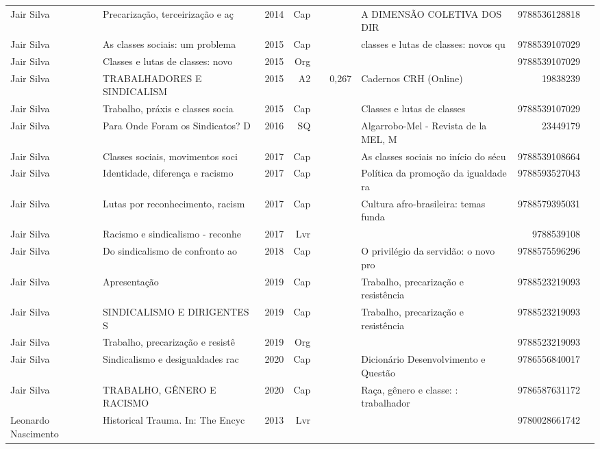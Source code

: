 \documentclass[12pt,brazil]{article}\usepackage[]{graphicx}\usepackage[]{xcolor}
\begin{document}
\begin{longtable}{lllrrllrr}
\rowcolor{coautr}Jair Silva & Precarização, terceirização e aç & 2014 & Cap &  &  & A DIMENSÃO COLETIVA DOS DIR & 9788536128818 \\
\rowcolor{ninval}Jair Silva & As classes sociais: um problema  & 2015 & Cap &  &  & classes e lutas de classes: novos qu & 9788539107029 \\
\rowcolor{ninval}Jair Silva & Classes e lutas de classes: novo & 2015 & Org &  &  &  & 9788539107029 \\
Jair Silva & TRABALHADORES E SINDICALISM & 2015 & A2 &  & 0,267 & Cadernos CRH (Online) & 19838239 \\
\rowcolor{ninval}Jair Silva & Trabalho, práxis e classes socia & 2015 & Cap &  &  & Classes e lutas de classes & 9788539107029 \\
Jair Silva & Para Onde Foram os Sindicatos? D & 2016 & SQ &  &  & Algarrobo-Mel - Revista de la MEL, M & 23449179 \\
Jair Silva & Classes sociais, movimentos soci & 2017 & Cap &  &  & As classes sociais no início do sécu & 9788539108664 \\
Jair Silva & Identidade, diferença e racismo & 2017 & Cap &  &  & Política da promoção da igualdade ra & 9788593527043 \\
Jair Silva & Lutas por reconhecimento, racism & 2017 & Cap &  &  & Cultura afro-brasileira: temas funda & 9788579395031 \\
Jair Silva & Racismo e sindicalismo - reconhe & 2017 & Lvr &  &  &  & 9788539108 \\
Jair Silva & Do sindicalismo de confronto ao  & 2018 & Cap &  &  & O privilégio da servidão: o novo pro & 9788575596296 \\
Jair Silva & Apresentação & 2019 & Cap &  &  & Trabalho, precarização e resistência & 9788523219093 \\
Jair Silva & SINDICALISMO E DIRIGENTES S & 2019 & Cap &  &  & Trabalho, precarização e resistência & 9788523219093 \\
Jair Silva & Trabalho, precarização e resistê & 2019 & Org &  &  &  & 9788523219093 \\
\rowcolor{duplic}Jair Silva & Sindicalismo e desigualdades rac & 2020 & Cap &  &  & Dicionário Desenvolvimento e Questão & 9786556840017 \\
Jair Silva & TRABALHO, GÊNERO E RACISMO  & 2020 & Cap &  &  & Raça, gênero e classe: : trabalhador & 9786587631172 \\
Leonardo Nascimento & Historical Trauma. In: The Encyc & 2013 & Lvr &  &  &  & 9780028661742 \\

\end{longtable}
\end{document}

